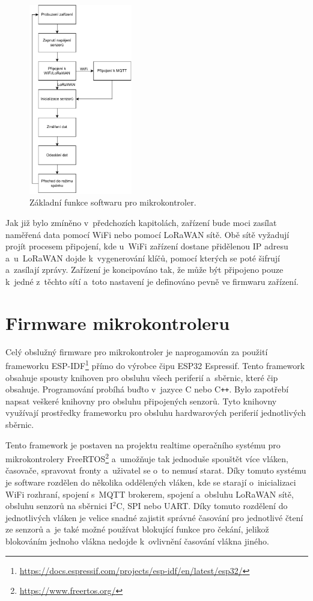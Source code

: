 \begin{figure}[h]
    \centering
    \includegraphics[width=0.4\textwidth]{obrazky/flowchart.pdf}
    \caption{Základní funkce softwaru pro mikrokontroler.}
    \label{fig_flowchart}
\end{figure}

Jak již bylo zmíněno v~předchozích kapitolách, zařízení bude moci zasílat naměřená data pomocí WiFi nebo pomocí LoRaWAN sítě. Obě sítě vyžadují projít procesem připojení, kde u~WiFi zařízení dostane přidělenou IP adresu a~u~LoRaWAN dojde k~vygenerování klíčů, pomocí kterých se poté šifrují a~zasílají zprávy. Zařízení je koncipováno tak, že může být připojeno pouze k~jedné z~těchto sítí a~toto nastavení je definováno pevně ve firmwaru zařízení. 

\section{Firmware mikrokontroleru}

Celý obslužný firmware pro mikrokontroler je naprogamován za použití frameworku ESP-IDF\footnote{\url{https://docs.espressif.com/projects/esp-idf/en/latest/esp32/}} přímo do výrobce čipu ESP32 Espressif. Tento framework obsahuje spou\-sty knihoven pro obsluhu všech periferií a~sběrnic, které čip obsahuje. Programování probíhá buďto v~jazyce C nebo C\texttt{++}. Bylo zapotřebí napsat veškeré knihovny pro obsluhu připojených senzorů. Tyto knihovny využívají prostředky frameworku pro obsluhu hardwarových periferií jednotlivých sběrnic.

Tento framework je postaven na projektu realtime operačního systému pro mikrokontrolery FreeRTOS\footnote{\url{https://www.freertos.org/}} a~umožňuje tak jednoduše spouštět více vláken, časovače, spravovat fronty a~uživatel se o~to nemusí starat. Díky tomuto systému je software rozdělen do několika oddělených vláken, kde se starají o~inicializaci WiFi rozhraní, spojení s~MQTT brokerem, spojení a~obsluhu LoRaWAN sítě, obsluhu senzorů na sběrnici I$^2$C, SPI nebo UART. Díky tomuto rozdělení do jednotlivých vláken je velice snadné zajistit správné časování pro jednotlivé čtení ze senzorů a~je také možné používat blokující funkce pro čekání, jelikož blokováním jednoho vlákna nedojde k~ovlivnění časování vlákna jiného.

